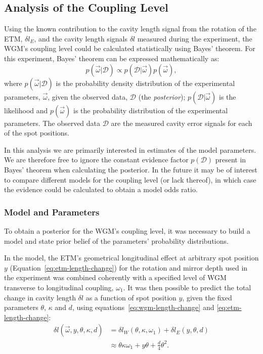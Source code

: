 \subsection{Analysis of the Coupling Level}
\label{sec:simulations}
Using the known contribution to the cavity length signal from the rotation of the \gls{ETM}, $\delta l_E$, and the cavity length signals $\delta l$ measured during the experiment, the \gls{WGM}'s coupling level could be calculated statistically using Bayes' theorem. For this experiment, Bayes' theorem can be expressed mathematically as:
\begin{equation}
  p \left( \vec{\omega} | \mathcal{D} \right) \propto p \left( \mathcal{D} | \vec{\omega} \right) p \left( \vec{\omega} \right),
  \label{eq:bayes}
\end{equation}
where $p \left( \vec{\omega} | \mathcal{D} \right)$ is the probability density distribution of the experimental parameters, $\vec{\omega}$, given the observed data, $\mathcal{D}$ (the \emph{posterior}); $p \left( \mathcal{D} | \vec{\omega} \right)$ is the likelihood and $p \left( \vec{\omega} \right)$ is the probability distribution of the experimental parameters. The observed data $\mathcal{D}$ are the measured cavity error signals for each of the spot positions.

In this analysis we are primarily interested in estimates of the model parameters. We are therefore free to ignore the constant evidence factor $p \left( \mathcal{D} \right)$ present in Bayes' theorem when calculating the posterior. In the future it may be of interest to compare different models for the coupling level (or lack thereof), in which case the evidence could be calculated to obtain a model odds ratio.

\subsubsection{Model and Parameters}
To obtain a posterior for the \gls{WGM}'s coupling level, it was necessary to build a model and state prior belief of the parameters' probability distributions.

In the model, the \gls{ETM}'s geometrical longitudinal effect at arbitrary spot position $y$ (Equation~\ref{eq:etm-length-change}) for the rotation and mirror depth used in the experiment was combined coherently with a specified level of \gls{WGM} transverse to longitudinal coupling, $\omega_1$. It was then possible to predict the total change in cavity length $\delta l$ as a function of spot position $y$, given the fixed parameters $\theta$, $\kappa$ and $d$, using equations~\ref{eq:wgm-length-change} and \ref{eq:etm-length-change}:
\begin{equation}
  \begin{split}
    \delta l \left( \vec{\omega}, y, \theta, \kappa, d \right) & = \delta l_W \left( \theta, \kappa, \omega_1 \right) + \delta l_E \left( y, \theta, d \right) \\
    & \approx \theta \kappa \omega_1 + y \theta + \frac{d}{4} \theta^2.
  \end{split}
\end{equation}

